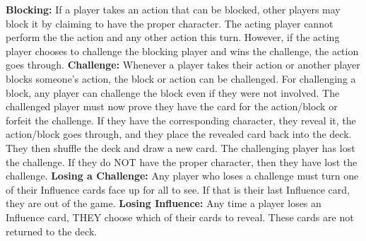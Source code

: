 \documentclass[11.5pt]{article}
\begin{document}
\noindent \textbf{Blocking:} If a player takes an action that can be blocked, other players may block it by claiming to have the proper character. The acting player cannot perform the the action and any other action this turn. However, if the acting player chooses to challenge the blocking player and wins the challenge, the action goes through.
\vskip 0.12cm
\noindent \textbf{Challenge:}  Whenever a player takes their action or another player blocks someone's action, the block or action can be challenged. For challenging a block, any player can challenge the block even if they were not involved. The challenged player must now prove they have the card for the action/block or forfeit the challenge. If they have the corresponding character, they reveal it, the action/block goes through, and they place the revealed card back into the deck. They then shuffle the deck and draw a new card. The challenging player has lost the challenge. If they do NOT have the proper character, then they have lost the challenge.
\vskip 0.12cm
\noindent \textbf{Losing a Challenge:} Any player who loses a challenge must turn one of their Influence cards face up
for all to see. If that is their last Influence card, they are out of the game. 
\vskip 0.12cm
\noindent \textbf{Losing Influence:} Any time a player loses an Influence card, THEY choose which of their cards to reveal. These cards are not returned to the deck. 
\end{document}
